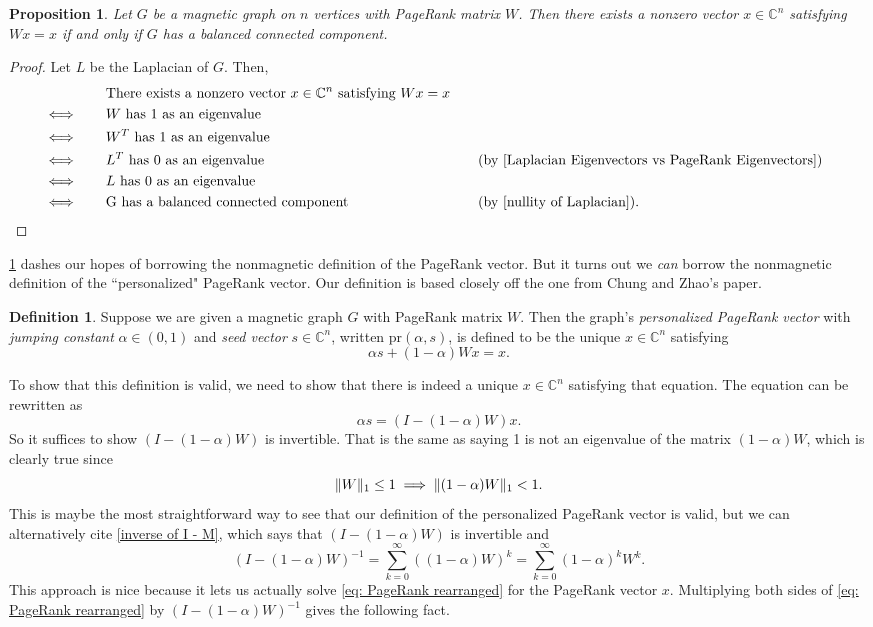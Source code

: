 \documentclass[12pt]{article}
\newtheorem{prop}[thm]{Proposition}
\theoremstyle{definition}
\newtheorem{defn}[thm]{Definition}
\newcommand{\C}{\mathbb C}
\DeclarePairedDelimiter\norm{\lVert}{\rVert}
\begin{document}
\begin{prop}\label{traditional PageRank vector exists iff graph has balanced connected component}
Let $G$ be a magnetic graph on $n$ vertices with PageRank matrix $W$. Then there exists a nonzero vector $x \in \C^n$ satisfying $W x = x$ if and only if $G$ has a balanced connected component.
\end{prop}
\begin{proof}
Let $L$ be the Laplacian of $G$. Then,
\begin{alignat*}{3}
&& &\text{There exists a nonzero vector } x \in \C^n \text{ satisfying } W x = x \\
&\iff\quad &&W \text{ has 1 as an eigenvalue} \\
&\iff &&W^T \text{ has 1 as an eigenvalue} \\
&\iff &&L^T \text{ has 0 as an eigenvalue} &\quad &\text{(by \cref{Laplacian Eigenvectors vs PageRank Eigenvectors})} \\
&\iff &&L \text{ has 0 as an eigenvalue} \\
&\iff &&\text{G has a balanced connected component} &&\text{(by \cref{nullity of Laplacian})}.
\end{alignat*}
\end{proof}

\cref{traditional PageRank vector exists iff graph has balanced connected component} dashes our hopes of borrowing the nonmagnetic definition of the PageRank vector. But it turns out we \textit{can} borrow the nonmagnetic definition of the ``personalized" PageRank vector. Our definition is based closely off the one from Chung and Zhao's paper.

\begin{defn}
Suppose we are given a magnetic graph $G$ with PageRank matrix $W$. Then the graph's \textit{personalized PageRank vector} with \textit{jumping constant} $\alpha \in (0, 1)$ and \textit{seed vector} $s \in \C^n$, written pr$(\alpha, s)$, is defined to be the unique $x \in \C^n$ satisfying
$$
\alpha s + (1 - \alpha) W x = x.
$$
\end{defn}

To show that this definition is valid, we need to show that there is indeed a unique $x \in \C^n$ satisfying that equation. The equation can be rewritten as 
\begin{equation}
\alpha s = (I - (1 - \alpha)W)x.\label{eq: PageRank rearranged}
\end{equation}
So it suffices to show $(I - (1 - \alpha)W)$ is invertible. That is the same as saying 1 is not an eigenvalue of the matrix $(1 - \alpha)W$, which is clearly true since 
$$
\norm{W}_1 \leq 1 \implies \norm{(1 - \alpha)W}_1 < 1.
$$ 
This is maybe the most straightforward way to see that our definition of the personalized PageRank vector is valid, but we can alternatively cite \cref{inverse of I - M}, which says that $(I - (1 - \alpha)W)$ is invertible and 
$$
(I - (1 - \alpha)W)^{-1} = \sum_{k=0}^{\infty} ((1 - \alpha) W)^k = \sum_{k=0}^{\infty} (1 - \alpha)^k W^k.
$$ This approach is nice because it lets us actually solve \cref{eq: PageRank rearranged} for the PageRank vector $x$. Multiplying both sides of \cref{eq: PageRank rearranged} by $(I - (1 - \alpha)W)^{-1}$ gives the following fact.
\end{document}
